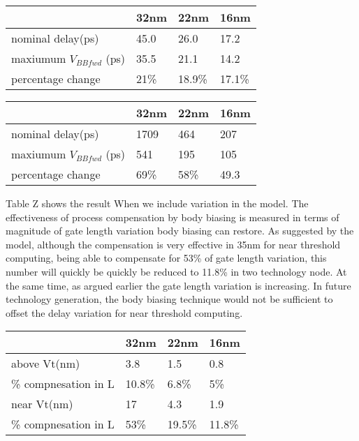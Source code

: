 \begin{center}
  \begin{tabular}{ | l | l | l | l | }
    \hline
    & 32nm & 22nm & 16nm \\ \hline
    nominal delay(ps) & 45.0 & 26.0 & 17.2 \\ \hline
    maxiumum $V_{BBfwd}$ (ps)  & 35.5 & 21.1 & 14.2 \\  \hline
    percentage change  & 21\% & 18.9\% & 17.1\% \\ 
    \hline
  \end{tabular}
\end{center}


\begin{center}
  \begin{tabular}{ | l | l | l | l | }
    \hline
    & 32nm & 22nm & 16nm \\ \hline
    nominal delay(ps) & 1709 & 464 & 207 \\ \hline
    maxiumum $V_{BBfwd}$ (ps)  & 541 & 195 & 105 \\  \hline
    percentage change  & 69\% & 58\% & 49.3 \\ 
    \hline
  \end{tabular}
\end{center}

Table Z shows the result When we include variation in the model. The
effectiveness of process compensation by body biasing is measured in terms of
magnitude of gate length variation body biasing can restore. As suggested by
the model, although the compensation is very effective in 35nm for near
threshold computing, being able to compensate for 53\% of gate length variation,
this number will quickly be quickly be reduced to 11.8\% in two technology node.
At the same time, as argued earlier the gate length variation is increasing. In
future technology generation, the body biasing technique would not be sufficient
to offset the delay variation for near threshold computing.    

\begin{center}
  \begin{tabular}{ | l | l | l | l | }
    \hline
    & 32nm & 22nm & 16nm \\ \hline
    above Vt(nm) & 3.8 & 1.5 & 0.8 \\ \hline
    \% compnesation in L  & 10.8\% & 6.8\% & 5\% \\ \hline
    near Vt(nm)  & 17 & 4.3 & 1.9\\  \hline
    \% compnesation in L & 53\% & 19.5\% & 11.8\% \\ 
    \hline
  \end{tabular}
\end{center}
